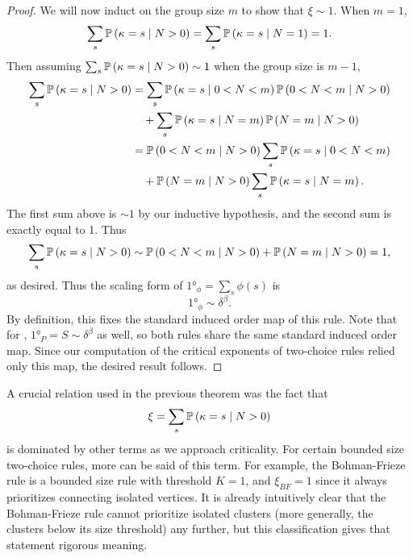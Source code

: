 \documentclass[twoside,10pt]{article}
\newcommand{\BF}{Bohman-Frieze\xspace}
\begin{document}
\begin{proof}
	We will now induct on the group size $m$ to show that $\xi \sim 1$. When $m=1$,
	\[
	\sum_{s} \P{ \kappa=s\;|\; N>0 } = \sum_{s}\P{ \kappa=s\;|\; N=1 } = 1.
	\] Then assuming $\sum_{s} \P{ \kappa=s\;|\; N>0 } \sim 1$ when the group size is $m-1$,
	\begin{align*}
		\sum_{s}\P{ \kappa=s\;|\; N>0 } &= \sum_{s}\P{ \kappa=s\;|\; 0<N<m }\P{ 0<N<m\;|\;N>0 } \\
							 &\quad + \sum_{s} \P{ \kappa=s\;|\; N=m }\P{ N=m\;|\;N>0 } \\
							 &= \P{ 0<N<m\;|\; N>0 } \sum_{s} \P{ \kappa=s\;|\; 0<N<m } \\
							 &\quad + \P{ N=m\;|\;N>0 }\sum_{s}\P{ \kappa=s\;|\; N=m }.
	\end{align*}
	The first sum above is $\sim 1$ by our inductive hypothesis, and the second sum is exactly equal to 1. Thus
	\[
		\sum_{s}\P{ \kappa=s\;|\; N>0 } \sim \P{ 0<N<m\;|\; N>0 } + \P{ N=m\;|\;N>0 } = 1,
	\]
	as desired. Thus the scaling form of $\ang{1}_{\phi}=\sum_{s}\phi(s)$ is
	\[
	\ang{1}_{\phi} \sim \delta^{\beta}.
	\] 
	By definition, this fixes the standard induced order map of this rule. 	Note that for \ER, $\ang{1}_{P} = S \sim \delta^{\beta}$ as well, so both rules share the same standard induced order map. Since our computation of the critical exponents of two-choice rules relied only this map, the desired result follows.
\end{proof}


A crucial relation used in the previous theorem was the fact that
\[
\xi = \sum_{s} \P{ \kappa=s\;|\; N>0 }
\] is dominated by other terms as we approach criticality. For certain bounded size two-choice rules, more can be said of this term. For example, the \BF rule is a bounded size rule with threshold $K=1$, and $\xi_{BF}= 1$ since it always prioritizes connecting isolated vertices. It is already intuitively clear that the \BF rule cannot prioritize isolated clusters (more generally, the clusters below its size threshold) any further, but this classification gives that statement rigorous meaning.


\printbibliography
\end{document}

